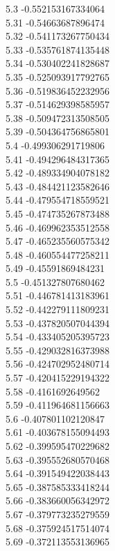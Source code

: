 {5.3	-0.552153167334064\\
5.31	-0.54663687896474\\
5.32	-0.541173267750434\\
5.33	-0.535761874135448\\
5.34	-0.530402241828687\\
5.35	-0.525093917792765\\
5.36	-0.519836452232956\\
5.37	-0.514629398585957\\
5.38	-0.509472313508505\\
5.39	-0.504364756865801\\
5.4	-0.499306291719806\\
5.41	-0.494296484317365\\
5.42	-0.489334904078182\\
5.43	-0.484421123582646\\
5.44	-0.479554718559521\\
5.45	-0.474735267873488\\
5.46	-0.469962353512558\\
5.47	-0.465235560575342\\
5.48	-0.460554477258211\\
5.49	-0.45591869484231\\
5.5	-0.451327807680462\\
5.51	-0.446781413183961\\
5.52	-0.442279111809231\\
5.53	-0.437820507044394\\
5.54	-0.433405205395723\\
5.55	-0.429032816373988\\
5.56	-0.424702952480714\\
5.57	-0.420415229194322\\
5.58	-0.4161692649562\\
5.59	-0.411964681156663\\
5.6	-0.407801102120847\\
5.61	-0.403678155094493\\
5.62	-0.399595470229682\\
5.63	-0.395552680570468\\
5.64	-0.391549422038443\\
5.65	-0.387585333418244\\
5.66	-0.383660056342972\\
5.67	-0.379773235279559\\
5.68	-0.375924517514074\\
5.69	-0.372113553136965\\
}
